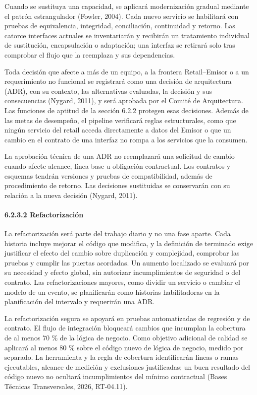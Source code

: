 \documentclass[11pt]{article}
\begin{document}
Cuando se sustituya una capacidad, se aplicará modernización gradual
mediante el patrón estrangulador (Fowler, 2004). Cada nuevo servicio se
habilitará con pruebas de equivalencia, integridad, conciliación,
continuidad y retorno. Las catorce interfaces actuales se inventariarán
y recibirán un tratamiento individual de sustitución, encapsulación o
adaptación; una interfaz se retirará solo tras comprobar el flujo que la
reemplaza y sus dependencias.

Toda decisión que afecte a más de un equipo, a la frontera
Retail--Emisor o a un requerimiento no funcional se registrará como una
decisión de arquitectura (ADR), con su contexto, las alternativas
evaluadas, la decisión y sus consecuencias (Nygard, 2011), y será
aprobada por el Comité de Arquitectura. Las funciones de aptitud de la
sección 6.2.2 protegen esas decisiones. Además de las metas de
desempeño, el pipeline verificará reglas estructurales, como que ningún
servicio del retail acceda directamente a datos del Emisor o que un
cambio en el contrato de una interfaz no rompa a los servicios que la
consumen.

La aprobación técnica de una ADR no reemplazará una solicitud de cambio
cuando afecte alcance, línea base u obligación contractual. Los
contratos y esquemas tendrán versiones y pruebas de compatibilidad,
además de procedimiento de retorno. Las decisiones sustituidas se
conservarán con su relación a la nueva decisión (Nygard, 2011).

\paragraph{6.2.3.2 Refactorización}\label{6-2-3-2-refactorizacion}

La refactorización será parte del trabajo diario y no una fase aparte. Cada historia incluye mejorar el código que modifica, y la definición de terminado exige justificar el efecto del cambio sobre duplicación y complejidad, comprobar las pruebas y cumplir las puertas acordadas. Un aumento localizado se evaluará por su necesidad y efecto global, sin autorizar incumplimientos de seguridad o del contrato. Las refactorizaciones mayores, como dividir un servicio o cambiar el modelo de un evento, se planificarán como historias habilitadoras en la planificación del intervalo y requerirán una ADR.

La refactorización segura se apoyará en pruebas automatizadas de
regresión y de contrato. El flujo de integración bloqueará cambios que
incumplan la cobertura de al menos 70 \% de la lógica de negocio. Como
objetivo adicional de calidad se aplicará al menos 80 \% sobre el código
nuevo de lógica de negocio, medido por separado. La herramienta y la
regla de cobertura identificarán líneas o ramas ejecutables, alcance de
medición y exclusiones justificadas; un buen resultado del código nuevo
no ocultará incumplimientos del mínimo contractual (Bases Técnicas
Transversales, 2026, RT-04.11).
\end{document}
